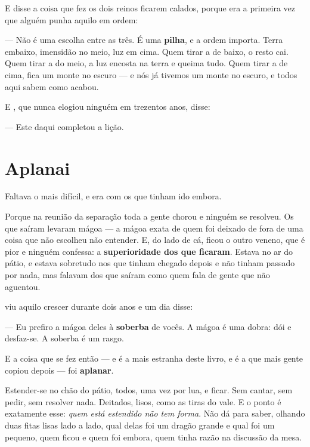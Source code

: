 \documentclass[livro.tex]{subfiles}
\begin{document}
\medskip

E disse a coisa que fez os dois reinos ficarem calados, porque era a primeira vez que alguém
punha aquilo em ordem:

--- Não é uma escolha entre as três. É uma \textbf{pilha}, e a ordem importa. Terra embaixo,
imensidão no meio, luz em cima. Quem tirar a de baixo, o resto cai. Quem tirar a do meio, a luz
encosta na terra e queima tudo. Quem tirar a de cima, fica um monte no escuro --- e nós já
tivemos um monte no escuro, e todos aqui sabem como acabou.

E \Qui , que nunca elogiou ninguém em trezentos anos, disse:

--- Este daqui completou a lição.

\section{Aplanai}

Faltava o mais difícil, e era com os que tinham ido embora.

\medskip

Porque na reunião da separação toda a gente chorou e ninguém se resolveu. Os que saíram levaram
mágoa --- a mágoa exata de quem foi deixado de fora de uma coisa que não escolheu não entender.
E, do lado de cá, ficou o outro veneno, que é pior e ninguém confessa: a \textbf{superioridade
dos que ficaram}. Estava no ar do pátio, e estava sobretudo nos que tinham chegado depois e não
tinham passado por nada, mas falavam dos que saíram como quem fala de gente que não aguentou.

\Qui viu aquilo crescer durante dois anos e um dia disse:

--- Eu prefiro a mágoa deles à \textbf{soberba} de vocês. A mágoa é uma dobra: dói e desfaz-se.
A soberba é um rasgo.

\medskip

E a coisa que se fez então --- e é a mais estranha deste livro, e é a que mais gente copiou
depois --- foi \textbf{aplanar}.

Estender-se no chão do pátio, todos, uma vez por lua, e ficar. Sem cantar, sem pedir, sem
resolver nada. Deitados, lisos, como as tiras do vale. E o ponto é exatamente esse: \emph{quem
está estendido não tem forma}. Não dá para saber, olhando duas fitas lisas lado a lado, qual
delas foi um dragão grande e qual foi um pequeno, quem ficou e quem foi embora, quem tinha razão
na discussão da mesa.
\end{document}
